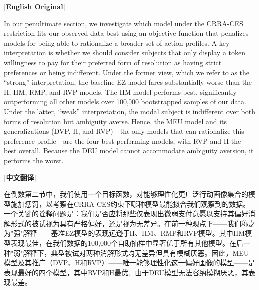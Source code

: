 \documentclass[12pt,a4paper]{ctexart}
\newenvironment{original}{%
  \par\medskip\noindent\textbf{[English Original]}\par\smallskip
  \color{black}\small
}{%
  \par\medskip
}
\newenvironment{translation}{%
  \par\noindent\textbf{[中文翻译]}\par\smallskip
  \color{blue}\small
}{%
  \par\bigskip
}
\theoremstyle{definition}
\theoremstyle{remark}
\begin{document}
\begin{original}
In our penultimate section, we investigate which model under the CRRA-CES restriction fits our observed data best using an objective function that penalizes models for being able to rationalize a broader set of action profiles. A key interpretation is whether we should consider subjects that only display a token willingness to pay for their preferred form of resolution as having strict preferences or being indifferent. Under the former view, which we refer to as the ``strong'' interpretation, the baseline EZ model fares substantially worse than the H, HM, RMP, and RVP models. The HM model performs best, significantly outperforming all other models over 100,000 bootstrapped samples of our data. Under the latter, ``weak'' interpretation, the modal subject is indifferent over both forms of resolution but ambiguity averse. Hence, the MEU model and its generalizations (DVP, H, and RVP)---the only models that can rationalize this preference profile---are the four best-performing models, with RVP and H the best overall. Because the DEU model cannot accommodate ambiguity aversion, it performs the worst.
\end{original}
\begin{translation}
在倒数第二节中，我们使用一个目标函数，对能够理性化更广泛行动画像集合的模型施加惩罚，以考察在CRRA-CES约束下哪种模型最能拟合我们观察到的数据。一个关键的诠释问题是：我们是否应将那些仅表现出微弱支付意愿以支持其偏好消解形式的被试视为具有严格偏好，还是视为无差异。在前一种观点下——我们称之为"强"解释——基准EZ模型的表现远逊于H、HM、RMP和RVP模型。其中HM模型表现最佳，在我们数据的100,000个自助抽样中显著优于所有其他模型。在后一种"弱"解释下，典型被试对两种消解形式均无差异但具有模糊厌恶。因此，MEU模型及其推广（DVP、H和RVP）——唯一能够理性化这一偏好画像的模型——是表现最好的四个模型，其中RVP和H最优。由于DEU模型无法容纳模糊厌恶，其表现最差。
\end{translation}
\end{document}
